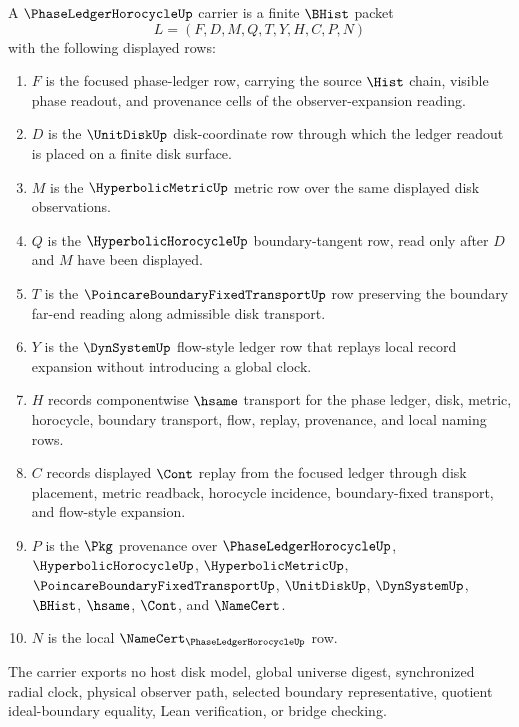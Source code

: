 \begin{definition}
\label{def:phase-ledger-horocycle-carrier}
A $\PhaseLedgerHorocycleUp$ carrier is a finite $\BHist$ packet
$$
L=(F,D,M,Q,T,Y,H,C,P,N)
$$
with the following displayed rows:
\begin{enumerate}
\item $F$ is the focused phase-ledger row, carrying the source $\Hist$ chain, visible phase readout, and provenance cells of the observer-expansion reading.
\item $D$ is the $\UnitDiskUp$ disk-coordinate row through which the ledger readout is placed on a finite disk surface.
\item $M$ is the $\HyperbolicMetricUp$ metric row over the same displayed disk observations.
\item $Q$ is the $\HyperbolicHorocycleUp$ boundary-tangent row, read only after $D$ and $M$ have been displayed.
\item $T$ is the $\PoincareBoundaryFixedTransportUp$ row preserving the boundary far-end reading along admissible disk transport.
\item $Y$ is the $\DynSystemUp$ flow-style ledger row that replays local record expansion without introducing a global clock.
\item $H$ records componentwise $\hsame$ transport for the phase ledger, disk, metric, horocycle, boundary transport, flow, replay, provenance, and local naming rows.
\item $C$ records displayed $\Cont$ replay from the focused ledger through disk placement, metric readback, horocycle incidence, boundary-fixed transport, and flow-style expansion.
\item $P$ is the $\Pkg$ provenance over $\PhaseLedgerHorocycleUp$, $\HyperbolicHorocycleUp$, $\HyperbolicMetricUp$, $\PoincareBoundaryFixedTransportUp$, $\UnitDiskUp$, $\DynSystemUp$, $\BHist$, $\hsame$, $\Cont$, and $\NameCert$.
\item $N$ is the local $\NameCert_{\PhaseLedgerHorocycleUp}$ row.
\end{enumerate}
The carrier exports no host disk model, global universe digest, synchronized radial clock, physical observer path, selected boundary representative, quotient ideal-boundary equality, Lean verification, or bridge checking.
\end{definition}

